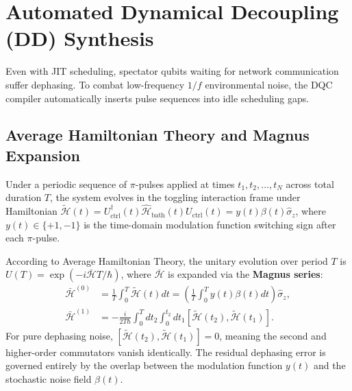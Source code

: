\section{Automated Dynamical Decoupling (DD) Synthesis}
\label{sec:dynamical_decoupling}

Even with JIT scheduling, spectator qubits waiting for network communication suffer dephasing. To combat low-frequency $1/f$ environmental noise, the DQC compiler automatically inserts  pulse sequences into idle scheduling gaps.

\subsection{Average Hamiltonian Theory and Magnus Expansion}
Under a periodic sequence of $\pi$-pulses applied at times $t_1, t_2, \dots, t_N$ across total duration $T$, the system evolves in the toggling interaction frame under Hamiltonian $\tilde{\mathcal{H}}(t) = U_{\text{ctrl}}^\dagger(t) \hat{\mathcal{H}}_{\text{bath}}(t) U_{\text{ctrl}}(t) = y(t) \beta(t) \hat{\sigma}_z$, where $y(t) \in \{+1, -1\}$ is the time-domain modulation function switching sign after each $\pi$-pulse.

According to Average Hamiltonian Theory, the unitary evolution over period $T$ is $U(T) = \exp(-i \bar{\mathcal{H}} T / \hbar)$, where $\bar{\mathcal{H}}$ is expanded via the \textbf{Magnus series}:
\begin{align}
    \bar{\mathcal{H}}^{(0)} &= \frac{1}{T} \int_{0}^{T} \tilde{\mathcal{H}}(t) dt = \left( \frac{1}{T} \int_{0}^{T} y(t) \beta(t) dt \right) \hat{\sigma}_z, \label{eq:magnus_order_0} \\
    \bar{\mathcal{H}}^{(1)} &= -\frac{i}{2 T \hbar} \int_{0}^{T} dt_2 \int_{0}^{t_2} dt_1 \left[ \tilde{\mathcal{H}}(t_2), \tilde{\mathcal{H}}(t_1) \right]. \label{eq:magnus_order_1}
\end{align}
For pure dephasing noise, $[\tilde{\mathcal{H}}(t_2), \tilde{\mathcal{H}}(t_1)] = 0$, meaning the second and higher-order commutators vanish identically. The residual dephasing error is governed entirely by the overlap between the modulation function $y(t)$ and the stochastic noise field $\beta(t)$.

